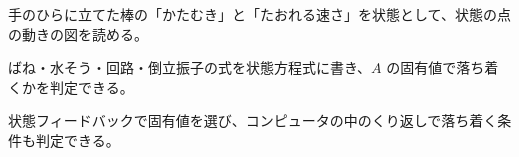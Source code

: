 \begin{furikaeri}
\begin{checklist}
\item 手のひらに立てた棒の「かたむき」と「たおれる速さ」を状態として、状態の点の動きの図を読める。
\item ばね・水そう・回路・倒立振子の式を状態方程式に書き、$A$ の固有値で落ち着くかを判定できる。
\item 状態フィードバックで固有値を選び、コンピュータの中のくり返しで落ち着く条件も判定できる。
\end{checklist}
\end{furikaeri}


